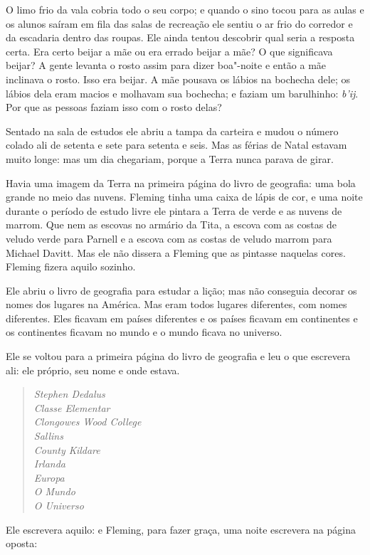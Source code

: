 O limo frio da vala cobria todo o seu corpo; e quando o sino tocou para as
aulas e os alunos saíram em fila das salas de recreação ele sentiu o ar
frio do corredor e da escadaria dentro das roupas. Ele ainda tentou
descobrir qual seria a resposta certa. Era certo beijar a mãe ou era
errado beijar a mãe? O que significava beijar? A gente levanta o rosto
assim para dizer boa"-noite e então a mãe inclinava o rosto. Isso era 
beijar. A mãe pousava os lábios na bochecha dele; os lábios dela eram
macios e molhavam sua bochecha; e faziam um barulhinho: \textit{b'ij}.
Por que as pessoas faziam isso com o rosto delas?

Sentado na sala de estudos ele abriu a tampa da carteira e mudou o
número colado ali de setenta e sete para setenta e seis. Mas as férias
de Natal estavam muito longe: mas um dia chegariam, porque a Terra
nunca parava de girar.

Havia uma imagem da Terra na primeira página do livro de geografia: uma
bola grande no meio das nuvens. Fleming tinha uma caixa de lápis de
cor, e uma noite durante o período de estudo livre ele pintara a Terra
de verde e as nuvens de marrom. Que nem as escovas no armário da Tita,
a escova com as costas de veludo verde para Parnell e a escova com as
costas de veludo marrom para Michael Davitt. Mas ele não dissera a
Fleming que as pintasse naquelas cores. Fleming fizera aquilo sozinho.

Ele abriu o livro de geografia para estudar a lição; mas não conseguia
decorar os nomes dos lugares na América. Mas eram todos lugares
diferentes, com nomes diferentes. Eles ficavam em países diferentes e
os países ficavam em continentes e os continentes ficavam no mundo e o
mundo ficava no universo.

Ele se voltou para a primeira página do livro de geografia e leu o que
escrevera ali: ele próprio, seu nome e onde estava.

\begin{verse}\itshape
Stephen Dedalus\\
Classe Elementar\\
Clongowes Wood College\\
Sallins\\
County Kildare\\
Irlanda\\
Europa\\
O Mundo\\
O Universo
\end{verse}

Ele escrevera aquilo: e Fleming, para fazer graça, uma noite escrevera na
página oposta:


